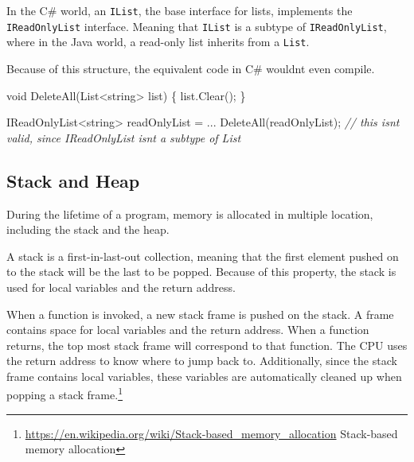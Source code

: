 \documentclass[
]{article}
\newenvironment{Shaded}{}{}
\newcommand{\CommentTok}[1]{\textcolor[rgb]{0.38,0.63,0.69}{\textit{#1}}}
\newcommand{\DataTypeTok}[1]{\textcolor[rgb]{0.56,0.13,0.00}{#1}}
\newcommand{\FunctionTok}[1]{\textcolor[rgb]{0.02,0.16,0.49}{#1}}
\newcommand{\NormalTok}[1]{#1}
\newcommand{\OperatorTok}[1]{\textcolor[rgb]{0.40,0.40,0.40}{#1}}
\begin{document}
In the C\# world, an \texttt{IList}, the base interface for lists,
implements the \texttt{IReadOnlyList} interface. Meaning that
\texttt{IList} is a subtype of \texttt{IReadOnlyList}, where in the Java
world, a read-only list inherits from a \texttt{List}.

Because of this structure, the equivalent code in C\#
wouldn\textquotesingle t even compile.

\begin{Shaded}
\begin{Highlighting}[]
\DataTypeTok{void} \FunctionTok{DeleteAll}\OperatorTok{(}\NormalTok{List}\OperatorTok{\textless{}}\DataTypeTok{string}\OperatorTok{\textgreater{}}\NormalTok{ list}\OperatorTok{)} 
\OperatorTok{\{}
\NormalTok{    list}\OperatorTok{.}\FunctionTok{Clear}\OperatorTok{();}
\OperatorTok{\}}

\NormalTok{IReadOnlyList}\OperatorTok{\textless{}}\DataTypeTok{string}\OperatorTok{\textgreater{}}\NormalTok{ readOnlyList }\OperatorTok{=} \OperatorTok{...}
\FunctionTok{DeleteAll}\OperatorTok{(}\NormalTok{readOnlyList}\OperatorTok{);} \CommentTok{// this isn\textquotesingle{}t valid, since IReadOnlyList isn\textquotesingle{}t a subtype of List}
\end{Highlighting}
\end{Shaded}

\subsection{Stack and Heap}\label{stack-and-heap}

During the lifetime of a program, memory is allocated in multiple
location, including the stack and the heap.

A stack is a first-in-last-out collection, meaning that the first
element pushed on to the stack will be the last to be popped. Because of
this property, the stack is used for local variables and the return
address.

When a function is invoked, a new stack frame is pushed on the stack. A
frame contains space for local variables and the return address. When a
function returns, the top most stack frame will correspond to that
function. The CPU uses the return address to know where to jump back to.
Additionally, since the stack frame contains local variables, these
variables are automatically cleaned up when popping a stack
frame.\footnote{\url{https://en.wikipedia.org/wiki/Stack-based_memory_allocation}
  Stack-based memory allocation}
\end{document}
